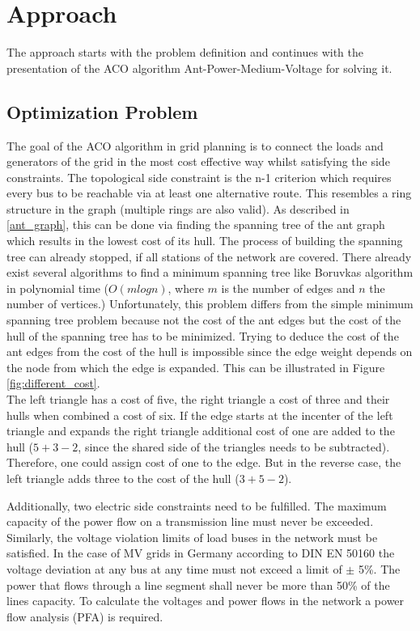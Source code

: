 \chapter{Approach}\label{chap:approach}
The approach starts with the problem definition and continues with the presentation of the ACO algorithm Ant-Power-Medium-Voltage for solving it.

\section{Optimization Problem}\label{optiproblem}
The goal of the ACO algorithm in grid planning is to connect the loads and generators of the grid in the most cost effective way whilst satisfying the side constraints. The topological side constraint is the n-1 criterion which requires every bus to be reachable via at least one alternative route. This resembles a ring structure in the graph (multiple rings are also valid). As described in \ref{ant_graph}, this can be done via finding the spanning tree of the ant graph which results in the lowest cost of its hull. The process of building the spanning tree can already stopped, if all stations of the network are covered. There already exist several algorithms to find a minimum spanning tree like Boruvkas algorithm in polynomial time ($O(mlogn)$, where $m$ is the number of edges and $n$ the number of vertices.) Unfortunately, this problem differs from the simple minimum spanning tree problem because not the cost of the ant edges but the cost of the hull of the spanning tree has to be minimized. Trying to deduce the cost of the ant edges from the cost of the hull is impossible since the edge weight depends on the node from which the edge is expanded. This can be illustrated in Figure \ref{fig:different_cost}.
 \\
The left triangle has a cost of five, the right triangle a cost of three and their hulls when combined a cost of six. If the edge starts at the incenter of the left triangle and expands the right triangle additional cost of one are added to the hull ($5+3-2$, since the shared side of the triangles needs to be subtracted). Therefore, one could assign cost of one to the edge. But in the reverse case, the left triangle adds three to the cost of the hull ($3+5-2$).

Additionally, two electric side constraints need to be fulfilled. The maximum capacity of the power flow on a transmission line must never be exceeded. Similarly, the voltage violation limits of load buses in the network must be satisfied. In the case of MV grids in Germany according to DIN EN 50160 the voltage deviation at any bus at any time must not exceed a limit of  $\pm$ 5\%. The power that flows through a line segment shall never be more than 50\% of the lines capacity. To calculate the voltages and power flows in the network a power flow analysis (PFA) is required.

